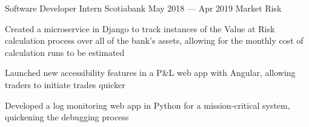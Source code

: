 \begin{cventries}
  \cventry
    {Software Developer Intern}
    {Scotiabank}
    {}
    {May 2018 --- Apr 2019}
    {Market Risk}
    {
      \begin{cvitems}
        \item {Created a microservice in Django to track instances of the Value at Risk calculation process over all of the bank's assets, allowing for the monthly cost of calculation runs to be estimated}
        \item {Launched new accessibility features in a P\&L web app with Angular, allowing traders to initiate trades quicker}
        \item {Developed a log monitoring web app in Python for a mission-critical system, quickening the debugging process}
      \end{cvitems}
    }
\end{cventries}

